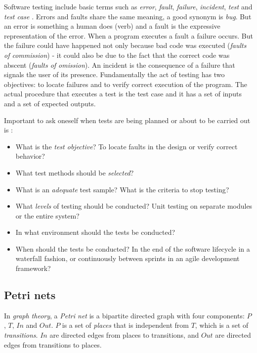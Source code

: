 Software testing include basic terms such as \textit{error}, \textit{fault},
\textit{failure}, \textit{incident}, \textit{test} and \textit{test case}
\cite{radatz1990ieee}. Errors and faults share the same meaning, a good synonym
is \textit{bug}. But an error is something a human does (verb) and a fault is
the expressive representation of the error. When a program executes a fault a
failure occurs. But the failure could have happened not only because bad code
was executed (\textit{faults of commission}) - it could also be due to the fact
that the correct code was abscent (\textit{faults of omission}). An incident is
the consequence of a failure that signals the user of its presence.
Fundamentally the act of testing has two objectives: to locate failures and to
verify correct execution of the program. The actual procedure that executes a
test is the test case and it has a set of inputs and a set of expected outputs.
\cite{jorgensen2016software}

Important to ask oneself when tests are being planned or about to be carried
out is \cite{bertolino2007software}:

\begin{itemize}
  \item What is the \textit{test objective}? To locate faults in the design or
    verify correct behavior?
  \item What test methods should be \textit{selected}?
  \item What is an \textit{adequate} test sample? What is the criteria to stop
    testing?
  \item What \textit{levels} of testing should be conducted? Unit testing on
    separate modules or the entire system?
  \item In what environment should the tests be conducted?
  \item When should the tests be conducted? In the end of the software
    lifecycle in a waterfall fashion, or continuously between sprints in an
    agile development framework?
\end{itemize}

\subsection{Petri nets}

In \textit{graph theory}, a \textit{Petri net} is a bipartite directed graph
with four components: $P$, $T$, $In$ and $Out$. $P$ is a set of \textit{places}
that is independent from $T$, which is a set of \textit{transitions}. $In$ are
directed edges from places to transitions, and $Out$ are directed edges from
transitions to places.
\cite{jorgensen2016software}

